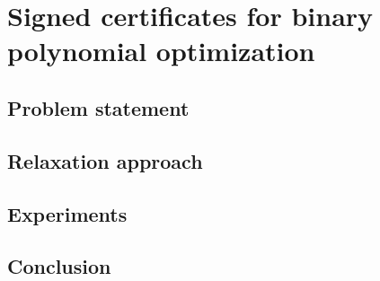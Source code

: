 \chapter{Signed certificates for binary polynomial optimization}


\section{Problem statement}



\section{Relaxation approach}

\section{Experiments}

\section{Conclusion}